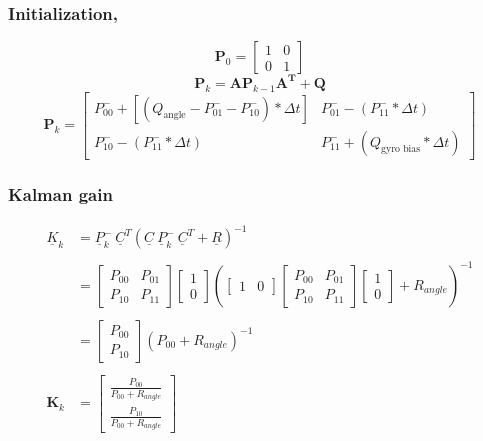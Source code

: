 \subsubsection{
	Initialization,
}
$$
\mathbf{P}_0 = \begin{bmatrix} 1 & 0 \\ 0 & 1 \end{bmatrix}
$$
$$
\mathbf{P}_k = \mathbf{A} \mathbf{P}_{k-1} \mathbf{A^T} + \mathbf{Q}
$$
$$
\mathbf{P}_k = \begin{bmatrix} P_{00}^- + [(Q_{\text{angle}} - P_{01}^- - P_{10}^-)*\Delta t]  &  P_{01}^- - (P_{11}^-*\Delta t)  
	\\ P_{10}^- - (P_{11}^-*\Delta t)  &  P_{11}^- + (Q_{\text{gyro bias}}*\Delta t) \end{bmatrix}
$$

\subsubsection{
	Kalman gain
}
$$
\begin{aligned}
	\underline{K}_{k} &= \underline{P}_{k}^- \ \underline{C}^T ( \underline{C} \ \underline{P}_{k}^-\ \underline{C}^T  +\underline{R})^{-1} \\
	\\
	&= 
	\begin{bmatrix} P_{00} & P_{01} \\ P_{10} & P_{11} \end{bmatrix} \begin{bmatrix} 1 \\ 0 \end{bmatrix}
	\left(
	\begin{bmatrix} 1 & 0 \end{bmatrix} 
	\begin{bmatrix} P_{00} & P_{01} \\ P_{10} & P_{11} \end{bmatrix}  
	\begin{bmatrix} 1 \\ 0 \end{bmatrix} 
	+ R_{angle}
	\right)^{-1} \\ \\
	&= 
	\begin{bmatrix} P_{00} \\ P_{10}\end{bmatrix}
	\left(
	P_{00}  
	+ R_{angle}
	\right)^{-1} \\ \\
	\mathbf{K}_k &= \begin{bmatrix} \frac{ P_{00} }{ P_{00}  
			+ R_{angle}} \\ \frac{ P_{10} }{ P_{00}  
			+ R_{angle}} \end{bmatrix}
\end{aligned}
$$

